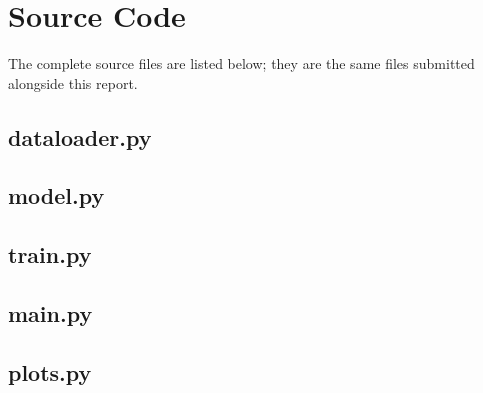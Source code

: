 \appendix
{}
%


\chapter{Source Code}
\label{app:source}

The complete source files are listed below; they are the same files
submitted alongside this report.

\section{dataloader.py}


\section{model.py}


\section{train.py}


\section{main.py}


\section{plots.py}

